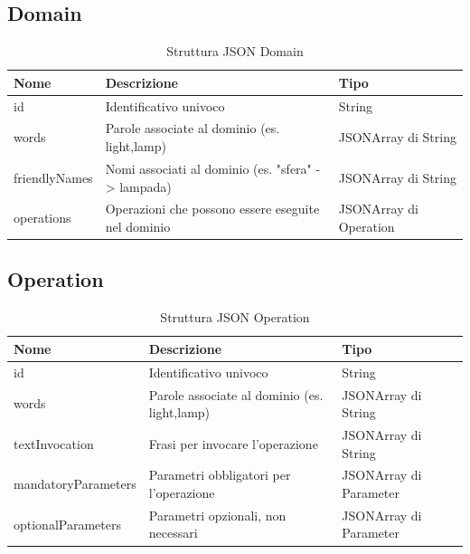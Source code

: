 \documentclass[twoside]{supsistudent}
\begin{document}
\subsection{Domain}
\begin{table}[H]
\centering
\caption{Struttura JSON Domain}
\label{Struttura JSON Domain}
\begin{tabular}{@{}|l|l|l|@{}}
\toprule
Nome          & Descrizione                                                                   & Tipo                   \\ \midrule
id            & Identificativo univoco                                                        & String                 \\ \midrule
words         & Parole associate al dominio (es. light,lamp)                         & JSONArray di String    \\ \midrule
friendlyNames & Nomi associati al dominio (es. "sfera" -> lampada) & JSONArray di String    \\ \midrule
operations    & Operazioni che possono essere eseguite nel dominio                   & JSONArray di Operation \\ \bottomrule
\end{tabular}
\end{table}

\subsection{Operation}
\begin{table}[H]
\centering
\caption{Struttura JSON Operation}
\label{Struttura JSON Operation}
\begin{tabular}{@{}|l|l|l|@{}}
\toprule
Nome                & Descrizione                                                               & Tipo                   \\ \midrule
id                  & Identificativo univoco                                                    & String                 \\ \midrule
words               & Parole associate al dominio (es. light,lamp)                     & JSONArray di String    \\ \midrule
textInvocation      & Frasi per invocare l'operazione         & JSONArray di String    \\ \midrule
mandatoryParameters & Parametri obbligatori per l'operazione     & JSONArray di Parameter \\ \midrule
optionalParameters  & Parametri opzionali, non necessari & JSONArray di Parameter \\ \bottomrule
\end{tabular}
\end{table}
\end{document}
